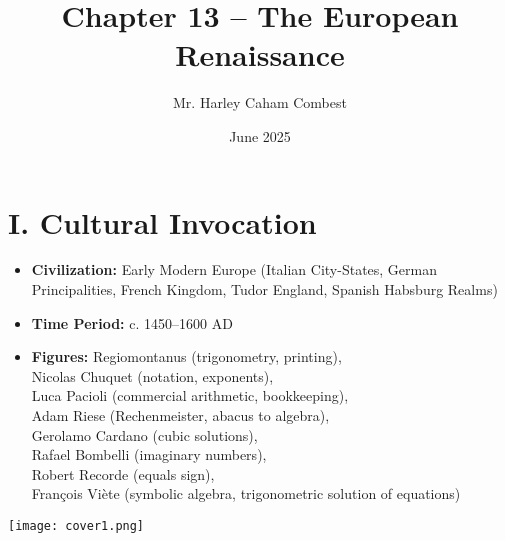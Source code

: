\documentclass[9pt]{article}
\title{Chapter 13 -- The European Renaissance}
\author{Mr. Harley Caham Combest}
\date{June 2025}
\begin{document}
\maketitle

\section*{I. Cultural Invocation}

\begin{itemize}
    \item \textbf{Civilization:} Early Modern Europe (Italian City-States, German Principalities, French Kingdom, Tudor England, Spanish Habsburg Realms)
    \item \textbf{Time Period:} c. 1450--1600 AD
    \item \textbf{Figures:} 
    Regiomontanus (trigonometry, printing), \\
    Nicolas Chuquet (notation, exponents), \\
    Luca Pacioli (commercial arithmetic, bookkeeping), \\
    Adam Riese (Rechenmeister, abacus to algebra), \\
    Gerolamo Cardano (cubic solutions), \\
    Rafael Bombelli (imaginary numbers), \\
    Robert Recorde (equals sign), \\
    Fran\c{c}ois Vi\`ete (symbolic algebra, trigonometric solution of equations)
\end{itemize}

\begin{center}
    \texttt{[image: cover1.png]}
\end{center}
\end{document}
